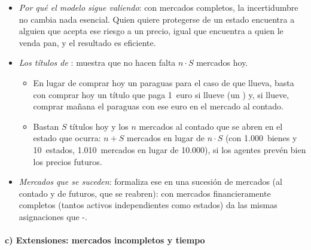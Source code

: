 \documentclass[11pt]{article}
\begin{document}
\begin{itemize}
\item \emph{Por qué el modelo sigue valiendo}: con mercados completos, la incertidumbre no cambia nada esencial. Quien quiere protegerse de un estado encuentra a alguien que acepta ese riesgo a un precio, igual que encuentra a quien le venda pan, y el resultado es eficiente.
\item \emph{Los títulos de }: \textcite{Arrow1953Role} muestra que no hacen falta $n\cdot S$ mercados hoy.
  \begin{itemize}
  \item En lugar de comprar hoy un paraguas para el caso de que llueva, basta con comprar hoy un título que paga 1~euro si llueve (un ) y, si llueve, comprar mañana el paraguas con ese euro en el mercado al contado.
  \item Bastan $S$ títulos hoy y los $n$ mercados al contado que se abren en el estado que ocurra: $n+S$ mercados en lugar de $n\cdot S$ (con 1.000~bienes y 10~estados, 1.010~mercados en lugar de 10.000), si los agentes prevén bien los precios futuros\nocite{Arrow1964Role}.
  \end{itemize}
\item \emph{Mercados que se suceden}: \textcite{Radner1972Existence} formaliza ese  en una sucesión de mercados (al contado y de futuros, que se reabren): con mercados financieramente completos (tantos activos independientes como estados) da las mismas asignaciones que -.
\end{itemize}

\paragraph{c) Extensiones: mercados incompletos y tiempo}
\end{document}
